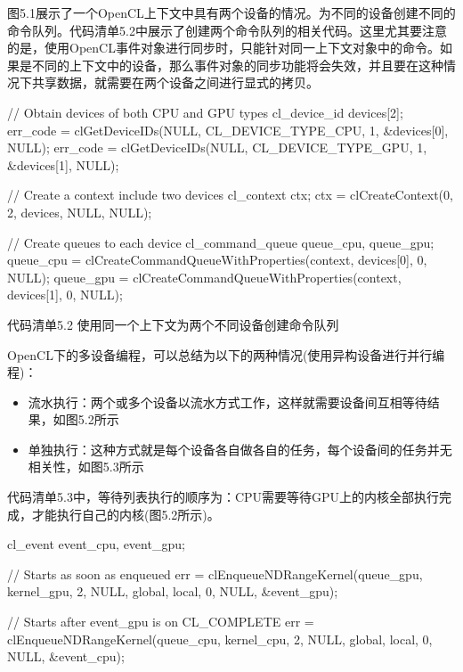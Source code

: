 图5.1展示了一个OpenCL上下文中具有两个设备的情况。为不同的设备创建不同的命令队列。代码清单5.2中展示了创建两个命令队列的相关代码。这里尤其要注意的是，使用OpenCL事件对象进行同步时，只能针对同一上下文对象中的命令。如果是不同的上下文中的设备，那么事件对象的同步功能将会失效，并且要在这种情况下共享数据，就需要在两个设备之间进行显式的拷贝。


\begin{codebox}[cpp]
// Obtain devices of both CPU and GPU types
cl_device_id devices[2];
err_code = clGetDeviceIDs(NULL, CL_DEVICE_TYPE_CPU, 1, &devices[0], NULL);
err_code = clGetDeviceIDs(NULL, CL_DEVICE_TYPE_GPU, 1, &devices[1], NULL);

// Create a context include two devices
cl_context ctx;
ctx = clCreateContext(0, 2, devices, NULL, NULL);

// Create queues to each device
cl_command_queue queue_cpu, queue_gpu;
queue_cpu = clCreateCommandQueueWithProperties(context, devices[0], 0, NULL);
queue_gpu = clCreateCommandQueueWithProperties(context, devices[1], 0, NULL);
\end{codebox}

代码清单5.2 使用同一个上下文为两个不同设备创建命令队列

OpenCL下的多设备编程，可以总结为以下的两种情况(使用异构设备进行并行编程)：

\begin{itemize}
\item 流水执行：两个或多个设备以流水方式工作，这样就需要设备间互相等待结果，如图5.2所示
\item 单独执行：这种方式就是每个设备各自做各自的任务，每个设备间的任务并无相关性，如图5.3所示
\end{itemize}

代码清单5.3中，等待列表执行的顺序为：CPU需要等待GPU上的内核全部执行完成，才能执行自己的内核(图5.2所示)。

\begin{codebox}[cpp]
cl_event event_cpu, event_gpu;

// Starts as soon as enqueued
err = clEnqueueNDRangeKernel(queue_gpu, kernel_gpu, 2, NULL, global, local, 0, NULL, &event_gpu);

// Starts after event_gpu is on CL_COMPLETE
err = clEnqueueNDRangeKernel(queue_cpu, kernel_cpu, 2, NULL, global, local, 0, NULL, &event_cpu);
\end{codebox}

